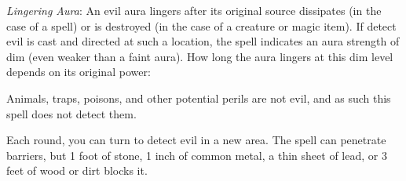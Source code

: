 {{}
	\textit{Lingering Aura}:
	An evil aura lingers after its original source dissipates (in the case of a spell) or is destroyed (in the case of a creature or magic item). If detect evil is cast and directed at such a location, the spell indicates an aura strength of dim (even weaker than a faint aura). How long the aura lingers at this dim level depends on its original power:


	Animals, traps, poisons, and other potential perils are not evil, and as such this spell does not detect them.

	Each round, you can turn to detect evil in a new area. The spell can penetrate barriers, but 1 foot of stone, 1 inch of common metal, a thin sheet of lead, or 3 feet of wood or dirt blocks it.

}
